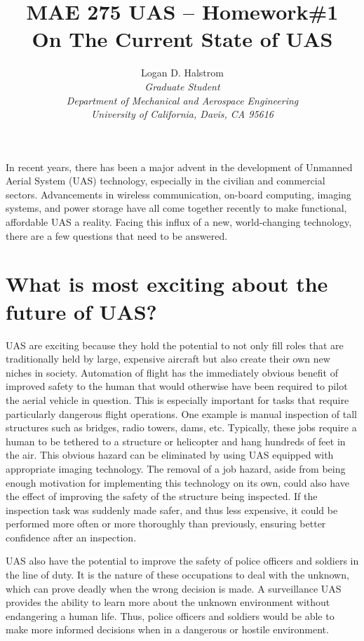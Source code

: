 \documentclass[]{aiaa-tc}%
\title{MAE 275 UAS -- Homework\#1 \\ On The Current State of UAS}
\author{
  Logan D. Halstrom \\
  {\normalsize\itshape Graduate Student} \\
  {\normalsize\itshape Department of Mechanical and Aerospace Engineering} \\
  {\normalsize\itshape University of California, Davis, CA 95616}
       }
\begin{document}
\maketitle


In recent years, there has been a major advent in the development of Unmanned Aerial System (UAS) technology, especially in the civilian and commercial sectors.  Advancements in wireless communication, on-board computing, imaging systems, and power storage have all come together recently to make functional, affordable UAS a reality.  Facing this influx of a new, world-changing technology, there are a few questions that need to be answered.

\section*{What is most exciting about the future of UAS?}

UAS are exciting because they hold the potential to not only fill roles that are traditionally held by large, expensive aircraft but also create their own new niches in society.  Automation of flight has the immediately obvious benefit of improved safety to the human that would otherwise have been required to pilot the aerial vehicle in question.  This is especially important for tasks that require particularly dangerous flight operations.  One example is manual inspection of tall structures such as bridges, radio towers, dams, etc.  Typically, these jobs require a human to be tethered to a structure or helicopter and hang hundreds of feet in the air.  This obvious hazard can be eliminated by using UAS equipped with appropriate imaging technology.  The removal of a job hazard, aside from being enough motivation for implementing this technology on its own, could also have the effect of improving the safety of the structure being inspected.  If the inspection task was suddenly made safer, and thus less expensive, it could be performed more often or more thoroughly than previously, ensuring better confidence after an inspection.

UAS also have the potential to improve the safety of police officers and soldiers in the line of duty.  It is the nature of these occupations to deal with the unknown, which can prove deadly when the wrong decision is made.  A surveillance UAS provides the ability to learn more about the unknown environment without endangering a human life.  Thus, police officers and soldiers would be able to make more informed decisions when in a dangerous or hostile environment.
\end{document}
